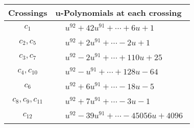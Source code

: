 \documentclass[1p]{elsarticle_modified}
\theoremstyle{definition}
\begin{document}
\begin{tabular}{m{50pt}|m{274pt}}
Crossings & \hspace{64pt}u-Polynomials at each crossing \\
\hline $$\begin{aligned}c_{1}\end{aligned}$$&$\begin{aligned}
&u^{92}+42 u^{91}+\cdots+6 u+1
\end{aligned}$\\
\hline $$\begin{aligned}c_{2},c_{5}\end{aligned}$$&$\begin{aligned}
&u^{92}+2 u^{91}+\cdots-2 u+1
\end{aligned}$\\
\hline $$\begin{aligned}c_{3},c_{7}\end{aligned}$$&$\begin{aligned}
&u^{92}-2 u^{91}+\cdots+110 u+25
\end{aligned}$\\
\hline $$\begin{aligned}c_{4},c_{10}\end{aligned}$$&$\begin{aligned}
&u^{92}- u^{91}+\cdots+128 u-64
\end{aligned}$\\
\hline $$\begin{aligned}c_{6}\end{aligned}$$&$\begin{aligned}
&u^{92}+6 u^{91}+\cdots-18 u-5
\end{aligned}$\\
\hline $$\begin{aligned}c_{8},c_{9},c_{11}\end{aligned}$$&$\begin{aligned}
&u^{92}+7 u^{91}+\cdots-3 u-1
\end{aligned}$\\
\hline $$\begin{aligned}c_{12}\end{aligned}$$&$\begin{aligned}
&u^{92}-39 u^{91}+\cdots-45056 u+4096
\end{aligned}$\\
\hline
\end{tabular}\\~\\
\newpage\renewcommand{\arraystretch}{1}
\end{document}
